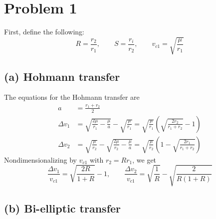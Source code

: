 \section{Problem 1}
\label{sec:problem1}

First, define the following:
\begin{equation*}
R=\frac{r_2}{r_1},\qquad S=\frac{r_i}{r_2},\qquad v_{c1}=\sqrt{\frac{\mu}{r_1}}
\end{equation*}

\subsection*{(a) Hohmann transfer}

The equations for the Hohmann transfer are
\begin{align*}
a &= \frac{r_1+r_2}{2}\\[4pt]
\Delta v_1 &= \sqrt{\frac{2\mu}{r_1}-\frac{\mu}{a}} - \sqrt{\frac{\mu}{r_1}}
  = \sqrt{\frac{\mu}{r_1}}\left(\sqrt{\frac{2r_2}{r_1+r_2}}-1\right)\\[4pt]
\Delta v_2 &= \sqrt{\frac{\mu}{r_2}} - \sqrt{\frac{2\mu}{r_2}-\frac{\mu}{a}}
  = \sqrt{\frac{\mu}{r_2}}\left(1-\sqrt{\frac{2r_1}{r_1+r_2}}\right)
\end{align*}
Nondimensionalizing by $v_{c1}$ with $r_2 = Rr_1$, we get
\begin{equation}
\boxed{\frac{\Delta v_1}{v_{c1}} = \sqrt{\frac{2R}{1+R}} - 1, \qquad
\frac{\Delta v_2}{v_{c1}} = \sqrt{\frac{1}{R}} - \sqrt{\frac{2}{R(1+R)}}}
\label{eq:p1-hohmann}
\end{equation}

\subsection*{(b) Bi-elliptic transfer}

